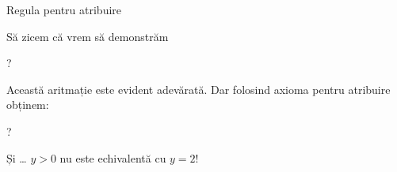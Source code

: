 %
%


\begin{frame}{Regula pentru atribuire}

\begin{example}
Să zicem că vrem să demonstrăm
\vspace{-.2cm} 
\begin{center}
?
\end{center}
\vspace{-.2cm}  \pause
Această aritmație este evident adevărată. Dar folosind axioma pentru atribuire obținem:
\vspace{-.2cm}
\begin{center}
?
\end{center}
\vspace{-.2cm} 
Și \ldots {\color{red} $y>0$ nu este echivalentă cu $y=2$!}
\end{example}
\end{frame}


